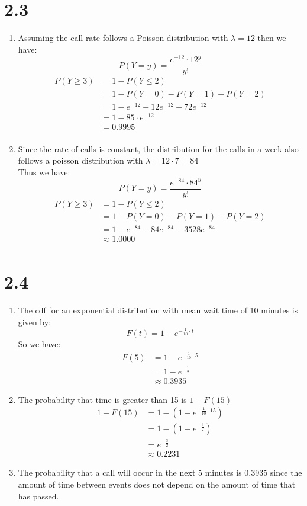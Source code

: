 \documentclass{article}
\begin{document}
\section*{2.3}
\begin{enumerate}
\item Assuming the call rate follows a Poisson distribution with $\lambda = 12$ then we have: \\
\[
P(Y = y) = \frac{e^{-12} \cdot 12^y}{y!}
\]
\begin{align*}
P(Y \geq 3) &= 1 - P(Y \leq 2) \\
&= 1 - P(Y = 0) - P(Y = 1) - P(Y = 2) \\
&= 1 - e^{-12} - 12e^{-12} - 72e^{-12} \\
&= 1 - 85 \cdot e^{-12} \\
&= 0.9995 \\
\end{align*}
\item Since the rate of calls is constant, the distribution for the calls in a week also follows a poisson distribution with $\lambda = 12 \cdot 7 = 84$ \\
Thus we have: \\
\[
P(Y = y) = \frac{e^{-84} \cdot 84^y}{y!}
\]
\begin{align*}
P(Y \geq 3) &= 1 - P(Y \leq 2) \\
&= 1 - P(Y = 0) - P(Y = 1) - P(Y = 2) \\
&= 1 - e^{-84} - 84e^{-84} - 3528e^{-84} \\
&\approx 1.0000 \\
\end{align*}
\end{enumerate}
\section*{2.4}
\begin{enumerate}
\item The cdf for an exponential distribution with mean wait time of 10 minutes is given by: \\
\[
F(t) = 1 - e^{-\frac{1}{10} \cdot t}
\]
So we have: \\
\begin{align*}
F(5) &= 1 - e^{-\frac{1}{10} \cdot 5} \\
&= 1 - e^{-\frac{1}{2}} \\
&\approx 0.3935
\end{align*}
\item The probability that time is greater than 15 is $1 - F(15)$
\begin{align*}
1 - F(15) &= 1 - (1 - e^{-\frac{1}{10} \cdot 15}) \\
&= 1 - (1 - e^{-\frac{3}{2}}) \\
&= e^{-\frac{3}{2}} \\
&\approx 0.2231
\end{align*}
\item The probability that a call will occur in the next 5 minutes is 0.3935 since the amount of time between events does not depend on the amount of time that has passed. \\
\end{enumerate}
\end{document}

